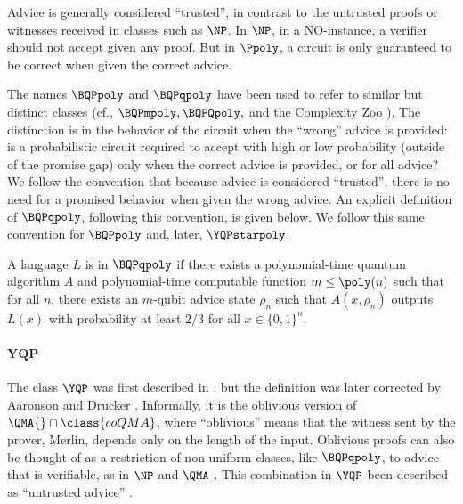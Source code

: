 Advice is generally considered ``trusted'', in contrast to the
untrusted proofs or witnesses received in classes such as $\NP$.
In $\NP$, in a NO-instance, a verifier should not accept given any proof.
But in $\Ppoly$, a circuit is only guaranteed to be correct when given the correct advice.

The names $\BQPpoly$ and $\BQPqpoly$ have been used to refer to similar but distinct classes
(cf., $\BQPmpoly, \BQPQpoly,$ and the Complexity Zoo \cite{ZooBQPmpoly}).
The distinction is in the behavior of the circuit when the ``wrong'' advice is provided:
is a probabilistic circuit required to accept with high or low probability
(outside of the promise gap) only when the correct advice is provided, or for all advice? 
We follow the convention that because
advice is considered ``trusted'', there is no need for a promised behavior
when given the wrong advice.
An explicit definition of $\BQPqpoly$, following this convention, is given below.
We follow this same convention for $\BQPpoly$ and, later, $\YQPstarpoly$.

\begin{definition}
	A language $L$ is in $\BQPqpoly$ if there exists a polynomial-time quantum algorithm $A$
	and polynomial-time computable function $m\leq \poly(n)$ such that for all $n$,
	there exists an $m$-qubit advice state $\rho_n$ such that $A(x,\rho_n)$ outputs $L(x)$
	with probability at least $2/3$ for all $x\in\{0,1\}^n$.
\end{definition}



\paragraph{\texorpdfstring{$\mathsf{\mathbf{YQP}}$}{YQP}}
The class $\YQP$ was first described in \cite{aaronson2007learnability},
but the definition was later corrected by Aaronson and Drucker \cite{aaronson2014full}.
Informally, it is the oblivious version of $\QMA{}\cap\class{coQMA}$,
where ``oblivious''
means that the witness sent by the prover, Merlin, depends only on the length of the input.
Oblivious proofs can also be thought of as a restriction of non-uniform classes, like $\BQPqpoly$,
to advice that is verifiable, as in $\NP$ and $\QMA$ \cite{goldreich2015input}.
This combination in $\YQP$ been described as
``untrusted advice'' \cite{aaronson2007learnability}.



